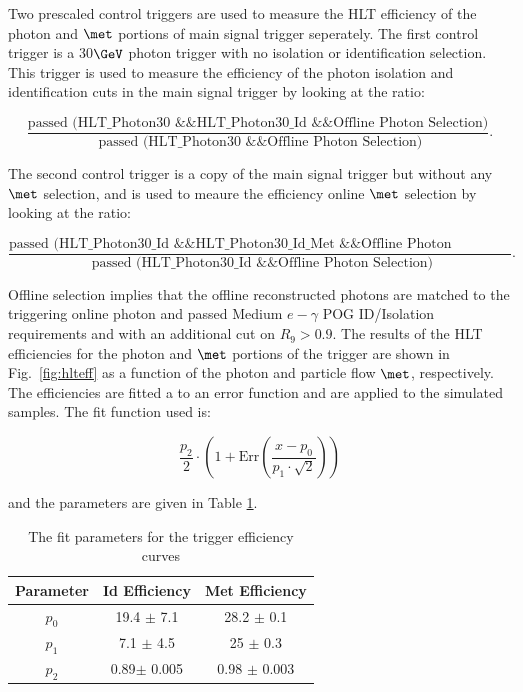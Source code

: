 Two prescaled control triggers are used to measure the HLT efficiency of the photon and $\met$ portions of main signal trigger seperately. The first control trigger is a 30$\GeV$ photon trigger with no isolation or identification selection. This trigger is used to measure the efficiency of the photon isolation and identification cuts in the main signal trigger by looking at the ratio:


\begin{equation}
  \frac{\text{passed (HLT\_Photon30 \&\& HLT\_Photon30\_Id \&\& Offline Photon Selection)}}{\text{ passed (HLT\_Photon30 \&\& Offline Photon Selection)}}.
\end{equation}

 The second control trigger is a copy of the main  signal trigger but without any $\met$ selection, and is used to meaure the efficiency online $\met$ selection by looking at the ratio:

\begin{equation}
  \frac{\text{passed (HLT\_Photon30\_Id \&\& HLT\_Photon30\_Id\_Met \&\& Offline Photon Selection)}}{\text{ passed (HLT\_Photon30\_Id \&\& Offline Photon Selection)}}.
\end{equation}

Offline selection implies that the offline reconstructed photons are  matched to the triggering online photon and passed Medium $e-\gamma$ POG ID/Isolation requirements and with an additional cut on $R_9 > 0.9$.  The results of the HLT efficiencies for the photon and $\met$ portions of the trigger are shown in Fig.~\ref{fig:hlteff} as a function of the photon \pt and particle flow $\met$, respectively. The efficiencies are fitted a to an error function and are applied to the simulated samples. The fit function used is:

\begin{equation}\label{eq:acc}
 	\frac{p_2}{2} \cdot \left( 1 + \text{Err}\left(\frac{x - p_0}{p_1 \cdot \sqrt{2}}\right)\right) %
\end{equation}

and the parameters are given in Table \ref{table:trigfits}.

\begin{table}[!h]
\centering
 \caption{The fit parameters for the trigger efficiency curves}
 \label{table:trigfits}         
 \begin{tabular}{|c|c|c|}
   \hline
   Parameter     &  Id Efficiency & Met Efficiency\\ 
   \hline
   \hline
  $p_0$ & 19.4 $\pm$ 7.1  &  28.2   $\pm$ 0.1 \\
  $p_1$ & 7.1 $\pm$ 4.5   &  25   $\pm$ 0.3 \\
  $p_2$ & 0.89$\pm$ 0.005 & 0.98 $\pm$ 0.003 \\
\hline          
 \end{tabular}
\end{table}

